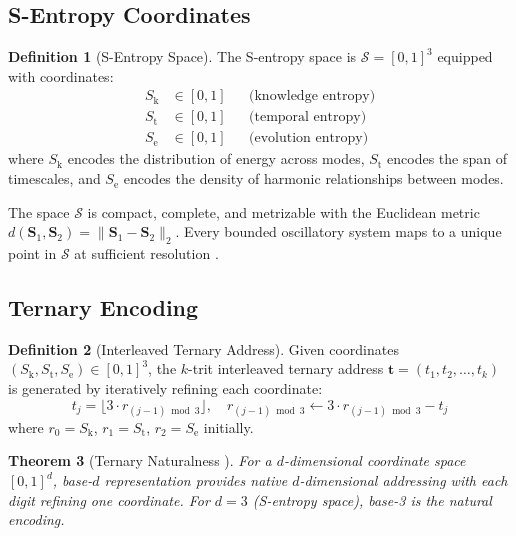 \documentclass[11pt,twocolumn,a4paper]{article}
\newtheorem{theorem}{Theorem}[section]
\theoremstyle{definition}
\newtheorem{definition}[theorem]{Definition}
\theoremstyle{remark}
\newcommand{\Sk}{S_{\mathrm{k}}}
\newcommand{\St}{S_{\mathrm{t}}}
\newcommand{\Se}{S_{\mathrm{e}}}
\newcommand{\Sspace}{\mathcal{S}}
\begin{document}
\subsection{S-Entropy Coordinates}

\begin{definition}[S-Entropy Space]
\label{def:s_space}
The S-entropy space is $\Sspace = [0,1]^3$ equipped with coordinates:
\begin{align}
\Sk &\in [0,1] && \text{(knowledge entropy)} \\
\St &\in [0,1] && \text{(temporal entropy)} \\
\Se &\in [0,1] && \text{(evolution entropy)}
\end{align}
where $\Sk$ encodes the distribution of energy across modes, $\St$ encodes the span of timescales, and $\Se$ encodes the density of harmonic relationships between modes.
\end{definition}

The space $\Sspace$ is compact, complete, and metrizable with the Euclidean metric $d(\mathbf{S}_1, \mathbf{S}_2) = \|\mathbf{S}_1 - \mathbf{S}_2\|_2$. Every bounded oscillatory system maps to a unique point in $\Sspace$ at sufficient resolution \citep{sachikonye2025a}.

\subsection{Ternary Encoding}

\begin{definition}[Interleaved Ternary Address]
\label{def:ternary}
Given coordinates $(\Sk, \St, \Se) \in [0,1]^3$, the $k$-trit interleaved ternary address $\mathbf{t} = (t_1, t_2, \ldots, t_k)$ is generated by iteratively refining each coordinate:
\begin{equation}
t_j = \lfloor 3 \cdot r_{(j-1) \bmod 3} \rfloor, \quad r_{(j-1) \bmod 3} \leftarrow 3 \cdot r_{(j-1) \bmod 3} - t_j
\end{equation}
where $r_0 = \Sk$, $r_1 = \St$, $r_2 = \Se$ initially.
\end{definition}

\begin{theorem}[Ternary Naturalness {\citep{sachikonye2025a}}]
\label{thm:ternary}
For a $d$-dimensional coordinate space $[0,1]^d$, base-$d$ representation provides native $d$-dimensional addressing with each digit refining one coordinate. For $d = 3$ (S-entropy space), base-3 is the natural encoding.
\end{theorem}
\end{document}
